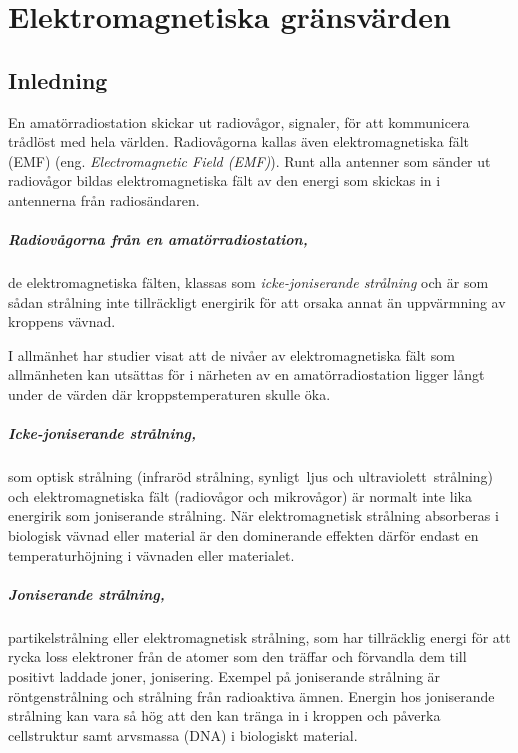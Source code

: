 \chapter[EMF gränsvärden]{Elektromagnetiska gränsvärden}
\label{EMF}

\section{Inledning}
En amatörradiostation skickar ut radiovågor, signaler, för att kommunicera
trådlöst med hela världen.
Radiovågorna kallas även elektromagnetiska fält (EMF)
(eng. \emph{Electromagnetic Field (EMF)}).
Runt alla antenner som sänder ut radiovågor bildas elektromagnetiska fält av den
energi som skickas in i antennerna från radiosändaren.

\paragraph{Radiovågorna från en amatörradiostation,} de elektro\-magnetiska fälten, klassas
som \emph{icke-joniserande strålning} och är som sådan strålning inte
tillräckligt energirik för att orsaka annat än uppvärmning av kroppens vävnad.

I allmänhet har studier visat att de nivåer av elektromagnetiska fält som
allmänheten kan utsättas för i närheten av en amatörradiostation ligger långt
under de värden där kroppstemperaturen skulle öka.

\paragraph{Icke-joniserande strålning,} som optisk strålning (infraröd strålning,
synligt~ljus och ultraviolett~strålning) och elektromagnetiska fält (radiovågor
och mikro\-vågor) är normalt inte lika energirik som joniserande strålning.
När elektromagnetisk strålning absorberas i biologisk vävnad eller material är
den dominerande effekten därför endast en temperaturhöjning i vävnaden eller
materialet.

\paragraph{Joniserande strålning,} partikelstrålning eller elektromagnetisk strålning, som
har tillräcklig energi för att rycka loss elektroner från de atomer som den
träffar och förvandla dem till positivt laddade joner, jonisering.
Exempel på joniserande strålning är röntgenstrålning och strålning från
radioaktiva ämnen.
Energin hos joniserande strålning kan vara så hög att den kan tränga in i
kroppen och påverka cellstruktur samt arvsmassa (DNA) i biologiskt material.

